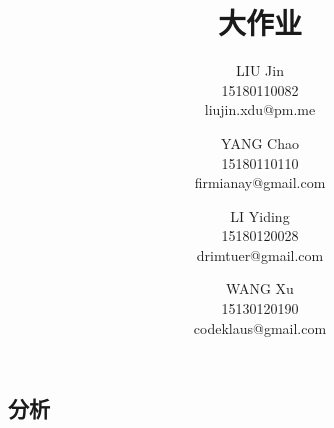 \documentclass{article}
\title{\classname{} 大作业}
\author{LIU Jin\\
15180110082 \\
\small{liujin.xdu@pm.me} \and
YANG Chao\\
15180110110 \\
\small{firmianay@gmail.com} \and
LI Yiding\\
15180120028 \\
\small{drimtuer@gmail.com} \and
WANG Xu\\
15130120190 \\
\small{codeklaus@gmail.com}
}
\begin{document}
\maketitle

\renewcommand{\contentsname}{目录}

\newpage
\tableofcontents
\newpage

\begin{center}
    \section{分析}
\end{center}

\setlength{\parindent}{2em}


\newpage
\end{document}
